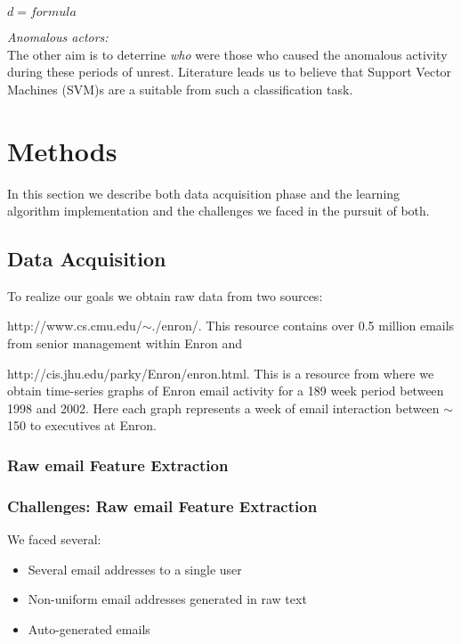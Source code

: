 \documentclass[11pt,letterpaper]{article}
\begin{document}
$d = formula$


\textit{Anomalous actors:} \\
The other aim is to deterrine \textit{who} were those who caused the anomalous
activity during these periods of unrest. Literature \cite{shon2007hybrid,shon2005machine}
leads us to believe that Support Vector Machines (SVM)s are a suitable from such 
a classification task. 


\section{Methods}
In this section we describe both data acquisition phase and the learning algorithm
implementation and the challenges we faced in the pursuit of both.

\subsection{Data Acquisition}
To realize our goals we obtain raw data from two sources:
\begin{inparaenum}[\itshape(i)]
\item http://www.cs.cmu.edu/$\sim$./enron/. This resource contains over 0.5 million
emails from senior management within Enron and 
\item http://cis.jhu.edu/parky/Enron/enron.html. This is a resource from where we obtain
time-series graphs of Enron email activity for a 189 week period between 1998 and 2002.
Here each graph represents a week of email interaction between $\sim$150 to executives
at Enron.
\end{inparaenum}

\subsubsection{Raw email Feature Extraction}

\subsubsection{Challenges: Raw email Feature Extraction}
We faced several:

\begin{itemize}
\item Several email addresses to a single user
\item Non-uniform email addresses generated in raw text
\item Auto-generated emails
\end{itemize}
\end{document}
